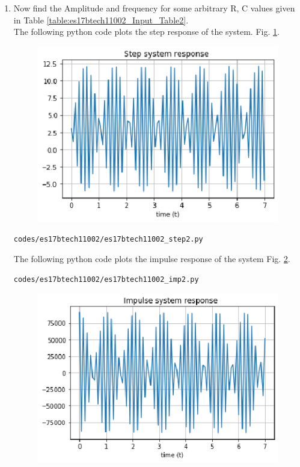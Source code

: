 \begin{enumerate}[label=\arabic*.,ref=\theenumi]
\item Now find the Amplitude and frequency for some arbitrary R, C values given in Table \ref{table:es17btech11002_Input_Table2}.\\

\solution The following python code plots the step response of the system. Fig. \ref{fig:es17btech11002_step2}.
\begin{figure}[!ht]
\centering
\includegraphics[width=\columnwidth]{./figs/es17btech11002/step2.eps}
\caption{}
\label{fig:es17btech11002_step2}
\end{figure}
\begin{lstlisting}
codes/es17btech11002/es17btech11002_step2.py
\end{lstlisting}
The following python code plots the impulse response of the system Fig. \ref{fig:es17btech11002_imp2}.
\begin{lstlisting}
codes/es17btech11002/es17btech11002_imp2.py
\end{lstlisting}
\begin{figure}[!ht]
\centering
\includegraphics[width=\columnwidth]{./figs/es17btech11002/imp2.eps}
\caption{}
\label{fig:es17btech11002_imp2}
\end{figure}


\end{enumerate}
